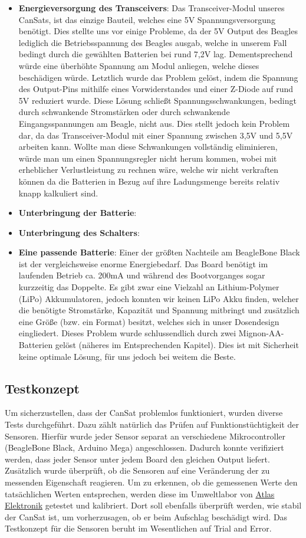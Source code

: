 \begin{itemize}
\item \textbf{Energieversorgung des Transceivers}: Das Transceiver-Modul unseres CanSats, ist das einzige Bauteil, welches eine 5V Spannungsversorgung benötigt. Dies stellte uns vor einige Probleme, da der 5V Output des Beagles lediglich die Betriebsspannung des Beagles ausgab, welche in unserem Fall bedingt durch die gewählten Batterien bei rund 7,2V lag. Dementsprechend würde eine überhöhte Spannung am Modul anliegen, welche dieses beschädigen würde. Letztlich wurde das Problem gelöst, indem die Spannung des Output-Pins mithilfe eines Vorwiderstandes und einer Z-Diode auf rund 5V reduziert wurde. Diese Lösung schließt Spannungsschwankungen, bedingt durch schwankende Stromstärken oder durch schwankende Eingangsspannungen am Beagle, nicht aus. Dies stellt jedoch kein Problem dar, da das Transceiver-Modul mit einer Spannung zwischen 3,5V und 5,5V arbeiten kann. Wollte man diese Schwankungen vollständig eliminieren, würde man um einen Spannungsregler nicht herum kommen, wobei mit erheblicher Verlustleistung zu rechnen wäre, welche wir nicht verkraften können da die Batterien in Bezug auf ihre Ladungsmenge bereits relativ knapp kalkuliert sind. 
\item \textbf{Unterbringung der Batterie}: 
\item \textbf{Unterbringung des Schalters}: 
\item \textbf{Eine passende Batterie}: Einer der größten Nachteile am BeagleBone Black ist der vergleichsweise enorme Energiebedarf. Das Board benötigt im laufenden Betrieb ca. 200mA und während des Bootvorganges sogar kurzzeitig das Doppelte. Es gibt zwar eine Vielzahl an Lithium-Polymer (LiPo) Akkumulatoren, jedoch konnten wir keinen LiPo Akku finden, welcher die benötigte Stromstärke, Kapazität und Spannung mitbringt und zusätzlich eine Größe (bzw. ein Format) besitzt, welches sich in unser Dosendesign eingliedert. Dieses Problem wurde schlussendlich durch zwei Mignon-AA- Batterien gelöst (näheres im Entsprechenden Kapitel). Dies ist mit Sicherheit keine optimale Lösung, für uns jedoch bei weitem die Beste.
\end{itemize}

\subsection{Testkonzept}
Um sicherzustellen, dass der CanSat problemlos funktioniert, wurden diverse Tests durchgeführt. Dazu zählt natürlich das Prüfen auf Funktionstüchtigkeit der Sensoren. Hierfür wurde jeder Sensor separat an verschiedene Mikrocontroller (BeagleBone Black, Arduino Mega) angeschlossen. Dadurch konnte verifiziert werden, dass jeder Sensor unter jedem Board den gleichen Output liefert. Zusätzlich wurde überprüft, ob die Sensoren auf eine Veränderung der zu messenden Eigenschaft reagieren. Um zu erkennen, ob die gemessenen Werte den tatsächlichen Werten entsprechen, werden diese im Umweltlabor von \href{https://www.atlas-elektronik.com/atlas-elektronik/}{Atlas Elektronik} getestet und kalibriert. Dort soll ebenfalls überprüft werden, wie stabil der CanSat ist, um vorherzusagen, ob er beim Aufschlag beschädigt wird. Das Testkonzept für die Sensoren beruht im Wesentlichen auf Trial and Error.

